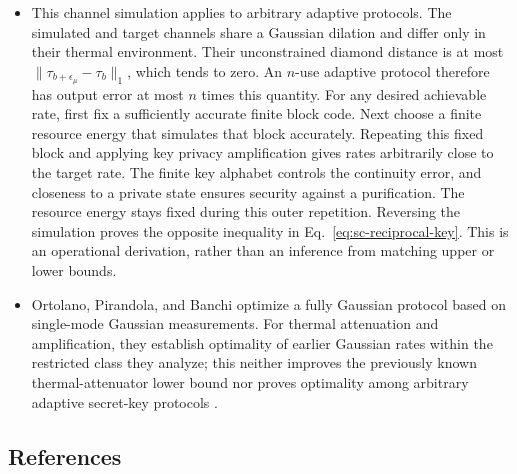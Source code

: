 \begin{itemize}
  \item This channel simulation applies to arbitrary adaptive protocols. The simulated and target channels share a Gaussian dilation and differ only in their thermal environment. Their unconstrained diamond distance is at most $\|\tau_{b+\epsilon_\mu}-\tau_b\|_1$, which tends to zero. An $n$-use adaptive protocol therefore has output error at most $n$ times this quantity. For any desired achievable rate, first fix a sufficiently accurate finite block code. Next choose a finite resource energy that simulates that block accurately. Repeating this fixed block and applying key privacy amplification gives rates arbitrarily close to the target rate. The finite key alphabet controls the continuity error, and closeness to a private state ensures security against a purification. The resource energy stays fixed during this outer repetition. Reversing the simulation proves the opposite inequality in Eq.~\eqref{eq:sc-reciprocal-key}. This is an operational derivation, rather than an inference from matching upper or lower bounds.

  \item Ortolano, Pirandola, and Banchi optimize a fully Gaussian protocol based on single-mode Gaussian measurements. For thermal attenuation and amplification, they establish optimality of earlier Gaussian rates within the restricted class they analyze; this neither improves the previously known thermal-attenuator lower bound nor proves optimality among arbitrary adaptive secret-key protocols .
\end{itemize}

\subsection*{References}

